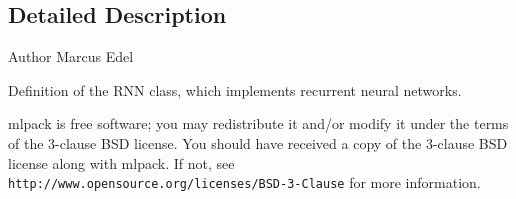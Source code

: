 \subsection{Detailed Description}
\begin{DoxyAuthor}{Author}
Marcus Edel
\end{DoxyAuthor}
Definition of the R\+NN class, which implements recurrent neural networks.

mlpack is free software; you may redistribute it and/or modify it under the terms of the 3-\/clause B\+SD license. You should have received a copy of the 3-\/clause B\+SD license along with mlpack. If not, see {\tt http\+://www.\+opensource.\+org/licenses/\+B\+S\+D-\/3-\/\+Clause} for more information. 